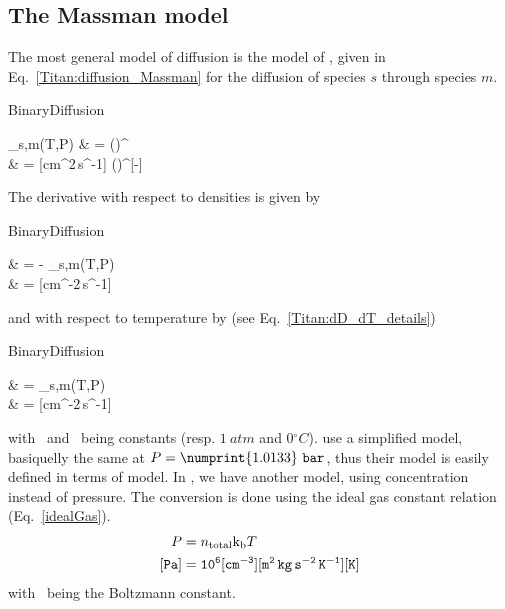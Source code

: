 \subsection{The Massman model}

The most general model of diffusion is the model of \citet{Massman1998}, given
in Eq.~\ref{Titan:diffusion_Massman} for the diffusion of species $s$ through
species $m$.
\begin{equationCode}{BinaryDiffusion}
\begin{split}
\diff_{s,m}(T,P)   &     =  \left(\right)^{} \\[5pt]
\uu [cm^2\,s^{-1}] & \uu = [cm^2\,s^{-1}] \frac{[Pa]}{[Pa]} \left(\frac{[K]}{[K]}\right)^{[-]}
\end{split}
\label{Titan:diffusion_Massman}
\end{equationCode}
The derivative with respect to densities is given by
\begin{equationCode}{BinaryDiffusion}
\begin{split}
      & = - \diff_{s,m}(T,P)\\[5pt]
\uu \frac{[cm^2\,s^{-1}]}{[cm^{-3}]} & \uu = [cm^{-2}\,s^{-1}]\frac{[-]}{[cm^{-3}]}
\end{split}
\label{Titan:diffusion_Massman_dn}
\end{equationCode}
and with respect to temperature by (see Eq.~\ref{Titan:dD_dT_details})
\begin{equationCode}{BinaryDiffusion}
\begin{split}
       & =   \diff_{s,m}(T,P)\\[5pt]
\uu \frac{[cm^2\,s^{-1}]}{[K]} & \uu = [cm^{-2}\,s^{-1}]\frac{[-]}{[K]}
\end{split}
\label{Titan:diffusion_Massman_dT}
\end{equationCode}
%
with \Pz\ and \Tz\ being constants (resp. $1~\unit{atm}$ and $0\unit{^\circ C}$).
\citet{Wakeham1973} use a simplified model, basiquelly the same at $P=\numprint{1.0133}~\unit{bar}$, thus
their model is easily defined in terms of \citet{Massman1998} model. In \citet{WilsonPhD,Haye2005},
we have another model, using concentration instead of pressure. The conversion is done
using the ideal gas constant relation (Eq.~\ref{idealGas}).
\begin{equation}
\begin{split}
P        & = n_\text{total}\text{k}_\text{b} T \\
\tt [Pa] & = \tt 10^{6} [cm^{-3}][\mathtt{m^2\,kg\,s^{-2}\,K^{-1}}] [K]
\end{split}
\label{idealGas}
\end{equation}
with \kb\ being the Boltzmann constant.

